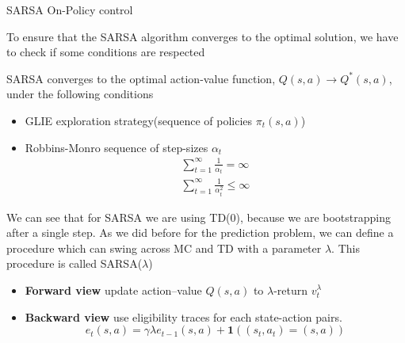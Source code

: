\documentclass[../main.tex]{subfiles}
\begin{document}
\begin{algorithm}[H]
    \SetAlgoLined


    \caption{SARSA On-Policy control}
\end{algorithm}
\par
\noindent
To ensure that the SARSA algorithm converges to the optimal solution, we have to check if some conditions are respected
\newpage
\begin{theorem}
    SARSA converges to the optimal action-value function, $Q(s,a) \rightarrow Q^*(s,a)$, under the following conditions
    \begin{itemize}
        \item GLIE exploration strategy(sequence of policies $\pi_t(s,a)$)
        \item Robbins-Monro sequence of step-sizes $\alpha_t$
              \begin{gather*}
                  \sum_{t=1}^{\infty} \frac{1}{\alpha_t} = \infty \\
                  \sum_{t=1}^{\infty} \frac{1}{\alpha_t^2} \leq \infty
              \end{gather*}
    \end{itemize}
\end{theorem}
We can see that for SARSA we are using TD(0), because we are bootstrapping after a single step. As we did before for the prediction problem, we can define a procedure which can swing across MC and TD with a parameter $\lambda$. This procedure is called SARSA($\lambda$)
\begin{itemize}
    \item \textbf{Forward view} update action–value $Q(s,a)$ to $\lambda$-return $v_t^{\lambda}$
    \item \textbf{Backward view} use eligibility traces for each state-action pairs.
          \begin{equation*}
              e_t(s,a) = \gamma \lambda e_{t-1}(s,a) + \mathbf{1}((s_t,a_t) = (s,a))
          \end{equation*}
\end{itemize}
\end{document}
